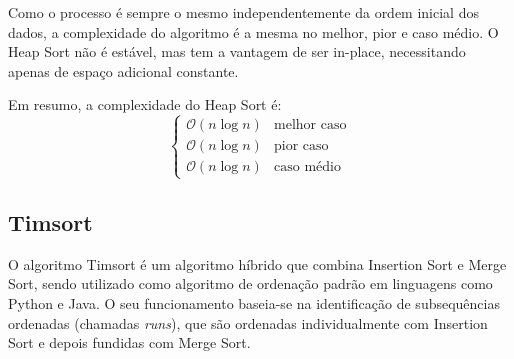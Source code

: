 \documentclass[conference]{IEEEtran}
\begin{document}
Como o processo é sempre o mesmo independentemente da ordem inicial dos dados, a complexidade do algoritmo é a mesma no melhor, pior e caso médio. O Heap Sort não é estável, mas tem a vantagem de ser in-place, necessitando apenas de espaço adicional constante.

Em resumo, a complexidade do Heap Sort é:
\[
\begin{cases}
\mathcal{O}(n \log n) & \text{melhor caso} \\
\mathcal{O}(n \log n) & \text{pior caso} \\
\mathcal{O}(n \log n) & \text{caso médio}
\end{cases}
\]

\subsection{Timsort}

O algoritmo Timsort é um algoritmo híbrido que combina Insertion Sort e Merge Sort, sendo utilizado como algoritmo de ordenação padrão em linguagens como Python e Java. O seu funcionamento baseia-se na identificação de subsequências ordenadas (chamadas \textit{runs}), que são ordenadas individualmente com Insertion Sort e depois fundidas com Merge Sort.
\end{document}
